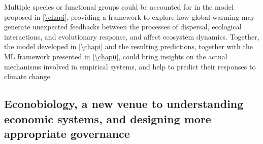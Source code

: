 % 
Multiple species or functional groups could be accounted for in the model proposed in \cref{\chapi}, providing a framework to explore how global warming may generate unexpected feedbacks between the processes of dispersal, ecological interactions, and evolutionary response, and affect ecosystem dynamics.
% 
Together, the model developed in \cref{\chapi} and the resulting predictions, together with the ML framework presented in \cref{\chapii}, could bring insights on the actual mechanisms involved in empirical systems, and help to predict their responses to climate change. 


\subsection{Econobiology, a new venue to understanding economic systems, and designing more appropriate governance}

